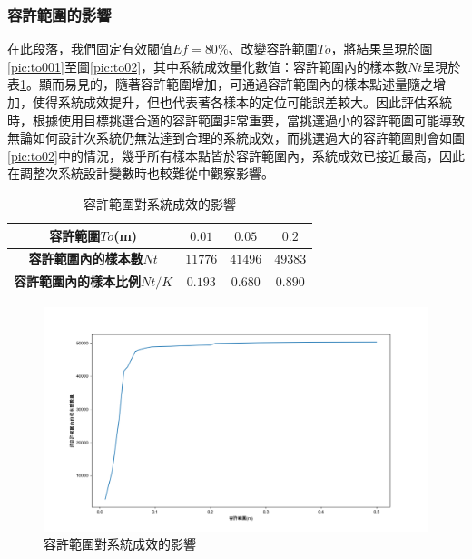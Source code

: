 \subsubsection{容許範圍的影響}
\label{chp:effect_to}

在此段落，我們固定有效閥值$Ef=80\%$、改變容許範圍$To$，將結果呈現於圖\ref{pic:to001}至圖\ref{pic:to02}，其中系統成效量化數值：容許範圍內的樣本數$Nt$呈現於表\ref{tab:ef_effect}。顯而易見的，隨著容許範圍增加，可通過容許範圍內的樣本點述量隨之增加，使得系統成效提升，但也代表著各樣本的定位可能誤差較大。因此評估系統時，根據使用目標挑選合適的容許範圍非常重要，當挑選過小的容許範圍可能導致無論如何設計次系統仍無法達到合理的系統成效，而挑選過大的容許範圍則會如圖\ref{pic:to02}中的情況，幾乎所有樣本點皆於容許範圍內，系統成效已接近最高，因此在調整次系統設計變數時也較難從中觀察影響。

\begin{table}[htpb]
    \begin{center}
      \caption{容許範圍對系統成效的影響}
      \label{tab:ef_effect}
      \begin{tabular}{|c||c|c|c|} %
        \hline  
       \textbf{容許範圍$To$(m)} 
       
       
       & $0.01$&$0.05$&$0.2$\\\hline\hline

       \textbf{容許範圍內的樣本數$Nt$} 
       & $11776$&$41496$&$49383$\\\hline
       \textbf{容許範圍內的樣本比例$Nt/K$} 
       & $0.193$&$0.680$&$0.890$\\\hline
     \end{tabular}
   \end{center}
 \end{table}

 \begin{figure}[htpb]
    \centering
    \includegraphics[width=15cm]{ch4pic/to_effect.png}
    \caption{容許範圍對系統成效的影響}
    \label{pic:to_effect}
\end{figure}

